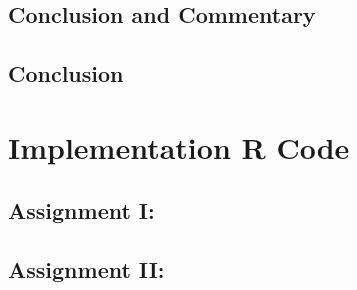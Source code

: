 \documentclass[12pt]{article}
\begin{document}
\subsection{Conclusion and Commentary}

\subsection{Conclusion}

\newpage
\appendix
\section{Implementation R Code}
\subsection{Assignment I:}

\subsection{Assignment II: }

\end{document}
